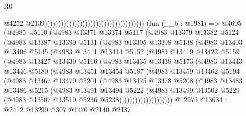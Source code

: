\begin{lexlean}{R0}
\begin{coremodule}
                                                                              @4252
                                                                              @2139)))))))))))))))))))))))))))))))))))))
    (fun (__b : @1981) =>
    @4605
      (@4985
        @5110
        (@4983
          @13371
          @13374
          @5117
          (@4983
            @13379
            @13382
            @5124
            (@4983
              @13387
              @13390
              @5131
              (@4983
                @13395
                @13398
                @5138
                (@4983
                  @13403
                  @13406
                  @5145
                  (@4983
                    @13411
                    @13414
                    @5152
                    (@4983
                      @13419
                      @13422
                      @5159
                      (@4983
                        @13427
                        @13430
                        @5166
                        (@4983
                          @13435
                          @13438
                          @5173
                          (@4983
                            @13443
                            @13446
                            @5180
                            (@4983
                              @13451
                              @13454
                              @5187
                              (@4983
                                @13459
                                @13462
                                @5194
                                (@4983
                                  @13467
                                  @13470
                                  @5201
                                  (@4983
                                    @13475
                                    @13478
                                    @5208
                                    (@4983
                                      @13483
                                      @13486
                                      @5215
                                      (@4983
                                        @13491
                                        @13494
                                        @5222
                                        (@4983
                                          @13499
                                          @13502
                                          @5229
                                          (@4983 @13507 @13510 @5236 @5238))))))))))))))))))))
    @12973
@13634 := @2412 @13290 @307 @1470 @2140 @2137

\end{coremodule}
\end{lexlean}
